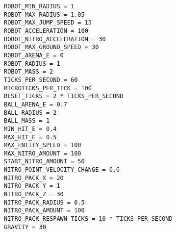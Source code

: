 \begin{verbatim}
ROBOT_MIN_RADIUS = 1
ROBOT_MAX_RADIUS = 1.05
ROBOT_MAX_JUMP_SPEED = 15
ROBOT_ACCELERATION = 100
ROBOT_NITRO_ACCELERATION = 30
ROBOT_MAX_GROUND_SPEED = 30
ROBOT_ARENA_E = 0
ROBOT_RADIUS = 1
ROBOT_MASS = 2
TICKS_PER_SECOND = 60
MICROTICKS_PER_TICK = 100
RESET_TICKS = 2 * TICKS_PER_SECOND
BALL_ARENA_E = 0.7
BALL_RADIUS = 2
BALL_MASS = 1
MIN_HIT_E = 0.4
MAX_HIT_E = 0.5
MAX_ENTITY_SPEED = 100
MAX_NITRO_AMOUNT = 100
START_NITRO_AMOUNT = 50
NITRO_POINT_VELOCITY_CHANGE = 0.6
NITRO_PACK_X = 20
NITRO_PACK_Y = 1
NITRO_PACK_Z = 30
NITRO_PACK_RADIUS = 0.5
NITRO_PACK_AMOUNT = 100
NITRO_PACK_RESPAWN_TICKS = 10 * TICKS_PER_SECOND
GRAVITY = 30
\end{verbatim}